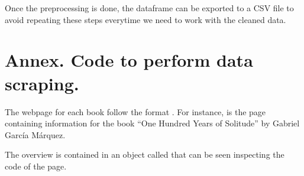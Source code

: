 \documentclass[letterpaper,10pt,english]{sphinxmanual}
\begin{document}
Once the preprocessing is done, the dataframe can be exported to a CSV file to avoid repeating these steps everytime we need to work with the cleaned data.

{
\begin{sphinxVerbatim}[commandchars=\\\{\}]
\llap{\color{nbsphinxin}[24]:\,\hspace{\fboxrule}\hspace{\fboxsep}}   
\end{sphinxVerbatim}
}


\section{Annex. Code to perform data scraping.}
\label{\detokenize{Data preprocessing:Annex.-Code-to-perform-data-scraping.}}
The webpage for each book follow the format . For instance,  is the page containing information for the book “One Hundred Years of Solitude” by Gabriel García Márquez.

The overview is contained in an object called  that can be seen inspecting the code of the page.
\end{document}
